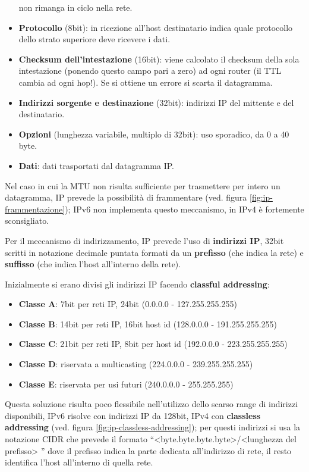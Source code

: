 \documentclass[11pt, italian, openany]{book}
\begin{document}
\begin{sloppypar}
\begin{itemize}[itemsep=0pt, topsep=0pt, parsep=0pt]
	non rimanga in ciclo nella rete.
	\item \textbf{Protocollo} (8bit): in ricezione all'host destinatario indica quale protocollo dello strato superiore deve ricevere i dati.
	\item \textbf{Checksum dell'intestazione} (16bit): viene calcolato il checksum della sola intestazione (ponendo questo campo pari a zero) ad ogni
	router (il TTL cambia ad ogni hop!). Se si ottiene un errore si scarta il datagramma.
	\item \textbf{Indirizzi sorgente e destinazione} (32bit): indirizzi IP del mittente e del destinatario.
	\item \textbf{Opzioni} (lunghezza variabile, multiplo di 32bit): uso sporadico, da 0 a 40 byte.
	\item \textbf{Dati}: dati trasportati dal datagramma IP.
\end{itemize}

Nel caso in cui la MTU non risulta sufficiente per trasmettere per intero un datagramma, IP prevede la possibilit\`a di frammentare (ved. figura
\ref{fig:ip-frammentazione}); IPv6 non implementa questo meccanismo, in IPv4 \`e fortemente sconsigliato.

Per il meccanismo di indirizzamento, IP prevede l'uso di \textbf{indirizzi IP}, 32bit scritti in notazione decimale puntata formati da un \textbf{prefisso}
(che indica la rete) e \textbf{suffisso} (che indica l'host all'interno della rete).
{}
Inizialmente si erano divisi gli indirizzi IP facendo \textbf{classful addressing}:
\begin{itemize}[itemsep=0pt,topsep=0pt,parsep=0pt]
	\item \textbf{Classe A}: 7bit per reti IP, 24bit (0.0.0.0 - 127.255.255.255)
	\item \textbf{Classe B}: 14bit per reti IP, 16bit host id (128.0.0.0 - 191.255.255.255)
	\item \textbf{Classe C}: 21bit per reti IP, 8bit per host id (192.0.0.0 - 223.255.255.255)
	\item \textbf{Classe D}: riservata a multicasting (224.0.0.0 - 239.255.255.255)
	\item \textbf{Classe E}: riservata per usi futuri (240.0.0.0 - 255.255.255)
\end{itemize}
Questa soluzione risulta poco flessibile nell'utilizzo dello scarso range di indirizzi disponibili, IPv6 risolve con indirizzi IP da 128bit, IPv4 con
\textbf{classless addressing} (ved. figura \ref{fig:ip-classless-addressing}); per questi indirizzi si usa la notazione CIDR che prevede il formato
``\textless{byte.byte.byte.byte}\textgreater{/}\textless{lunghezza del prefisso}\textgreater{ }'' dove il prefisso indica la parte dedicata all'indirizzo di
rete, il resto identifica l'host all'interno di quella rete.


\end{sloppypar}
\end{document}
